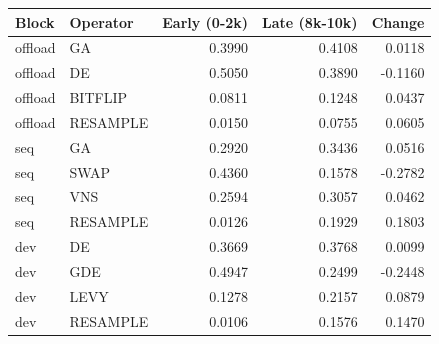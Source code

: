 \begin{tabular}{llrrr}
\toprule
Block & Operator & Early (0-2k) & Late (8k-10k) & Change \\
\midrule
offload & GA & 0.3990 & 0.4108 & 0.0118 \\
offload & DE & 0.5050 & 0.3890 & -0.1160 \\
offload & BITFLIP & 0.0811 & 0.1248 & 0.0437 \\
offload & RESAMPLE & 0.0150 & 0.0755 & 0.0605 \\
seq & GA & 0.2920 & 0.3436 & 0.0516 \\
seq & SWAP & 0.4360 & 0.1578 & -0.2782 \\
seq & VNS & 0.2594 & 0.3057 & 0.0462 \\
seq & RESAMPLE & 0.0126 & 0.1929 & 0.1803 \\
dev & DE & 0.3669 & 0.3768 & 0.0099 \\
dev & GDE & 0.4947 & 0.2499 & -0.2448 \\
dev & LEVY & 0.1278 & 0.2157 & 0.0879 \\
dev & RESAMPLE & 0.0106 & 0.1576 & 0.1470 \\
\bottomrule
\end{tabular}
